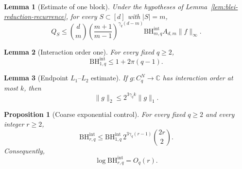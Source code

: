 \documentclass[10pt,a4paper]{amsart}
\newtheorem{lemma}{Lemma}
\newtheorem{proposition}{Proposition}
\newcommand{\BHint}[2]{\mathrm{BH}^{\mathrm{int}}_{#1,#2}}
\newcommand{\C}{\mathbb C}
\begin{document}
\begin{lemma}[Estimate of one block]\label{lem:one-block-estimate}
Under the hypotheses of Lemma~\ref{lem:blei-reduction-recurrence}, for every
$S\subset[d]$ with $|S|=m$,
\begin{equation}\label{eq:QS-final}
 Q_S\leq
 \binom dm
 \left(\frac{m+1}{m-1}\right)^{\gamma_q(d-m)}
 \BHint{m}{q}A_{d,m}\|f\|_\infty.
\end{equation}
\end{lemma}

\begin{lemma}[Interaction order one]\label{lem:interaction-one}
For every fixed $q\geq2$,
\begin{equation}\label{eq:B1-elementary}
 \BHint{1}{q}\leq 1+2\pi(q-1).
\end{equation}
\end{lemma}

\begin{lemma}[Endpoint $L_1$--$L_2$ estimate]\label{lem:endpoint-L1-L2}
If $g:C_q^N\to\C$ has interaction order at most $k$, then
\begin{equation}\label{eq:L1-L2-coarse}
 \|g\|_2\leq2^{3\gamma_q k}\|g\|_1.
\end{equation}
\end{lemma}

\begin{proposition}[Coarse exponential control]\label{prop:coarse-bound}
For every fixed $q\geq2$ and every integer $r\geq2$,
\begin{equation}\label{eq:coarse-exponential}
 \BHint{r}{q}
 \leq
 \BHint{1}{q}\,2^{3\gamma_q(r-1)}\binom{2r}{2}.
\end{equation}
Consequently,
\begin{equation}\label{eq:coarse-bound-log}
 \log\BHint{r}{q}=O_q(r).
\end{equation}
\end{proposition}
\end{document}

